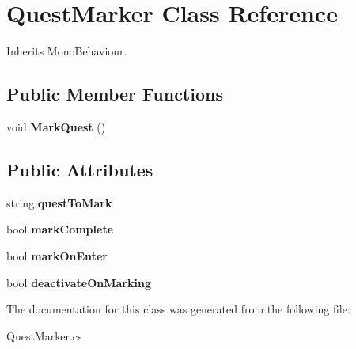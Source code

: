 \hypertarget{class_quest_marker}{}\section{Quest\+Marker Class Reference}
\label{class_quest_marker}


Inherits Mono\+Behaviour.

\subsection*{Public Member Functions}
\begin{DoxyCompactItemize}
\item 
\mbox{\label{class_quest_marker_a0333ab59b16ffa278ccbb161a0e06ab1}} 
void {\bfseries Mark\+Quest} ()
\end{DoxyCompactItemize}
\subsection*{Public Attributes}
\begin{DoxyCompactItemize}
\item 
\mbox{\label{class_quest_marker_a08c456bacbc6a8fb189588b97b70c16f}} 
string {\bfseries quest\+To\+Mark}
\item 
\mbox{\label{class_quest_marker_a325e4f28e132a76afaaf298b0060d4d9}} 
bool {\bfseries mark\+Complete}
\item 
\mbox{\label{class_quest_marker_aeb4a0f4629e843d4b96d51fdfdd671d8}} 
bool {\bfseries mark\+On\+Enter}
\item 
\mbox{\label{class_quest_marker_a2e5946e46ae8e4240e0e13e74adfa02e}} 
bool {\bfseries deactivate\+On\+Marking}
\end{DoxyCompactItemize}


The documentation for this class was generated from the following file\+:\begin{DoxyCompactItemize}
\item 
Quest\+Marker.\+cs\end{DoxyCompactItemize}
